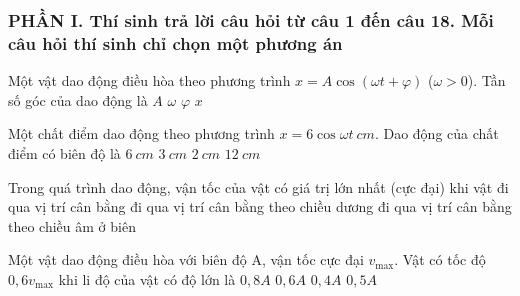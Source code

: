 \subsubsection*{PHẦN I. Thí sinh trả lời câu hỏi từ câu 1 đến câu 18. Mỗi câu hỏi thí sinh chỉ chọn một phương án}
\setcounter{ex}{0}
	\begin{ex} %
		Một vật dao động điều hòa theo phương trình $x = A\cos\left(\omega t + \varphi \right)$ ($\omega  > 0$). Tần số góc của dao động là
		\choice
		{$A$}
		{\True $\omega$}
		{$\varphi$}
		{$x$}
	\end{ex}
	\begin{ex}%
		Một chất điểm dao động theo phương trình $x = 6\cos \omega t\ cm$. Dao động của chất điểm có biên độ là
		\choice
		{\True $6\ cm$}
		{$3\ cm$}
		{$2\ cm$}
		{$12\ cm$}
		
	\end{ex}
	\begin{ex}%
		Trong quá trình dao động, vận tốc của vật có giá trị lớn nhất (cực đại) khi vật
		\choice
		{đi qua vị trí cân bằng}
		{\True đi qua vị trí cân bằng theo chiều dương}
		{đi qua vị trí cân bằng theo chiều âm}
		{ở biên}
	\end{ex}
	\begin{ex}%
		Một vật dao động điều hòa với biên độ A, vận tốc cực đại $v_{\max}$. Vật có tốc độ $0,6v_{\max}$ khi li độ của vật có độ lớn là
		\choice
		{\True $0,8A$}
		{$0,6A$}
		{$0,4A$}
		{$0,5A$}
		
		
	\end{ex}
